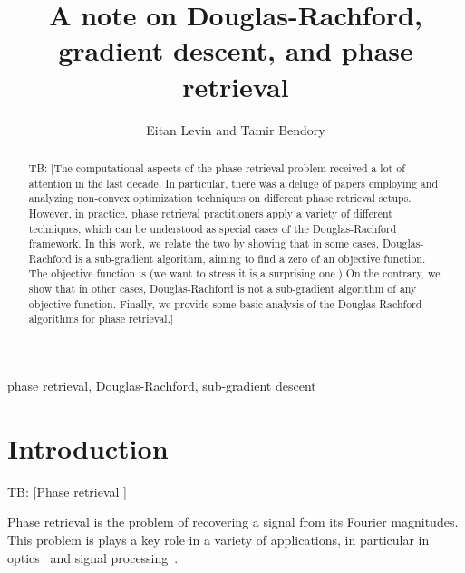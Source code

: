 \documentclass[journal]{IEEEtran}
\theoremstyle{definition}
\theoremstyle{remark}
\theoremstyle{definition}
\theoremstyle{problem}
\theoremstyle{definition}
\newcommand{\tb}[1]{{\color{blue}TB: {[#1]}}}
\begin{document}

\title{A note on Douglas-Rachford, gradient descent, and phase retrieval}

\author{Eitan Levin and Tamir Bendory}
\maketitle

\begin{abstract}
\tb{The computational aspects of the phase retrieval problem received a lot of attention in the last decade. In particular, there was a deluge of papers employing and analyzing non-convex optimization techniques on different phase retrieval setups. However, in practice, phase retrieval practitioners apply a variety of different techniques, which can be understood as special cases of the Douglas-Rachford framework. In this work, we relate the two by showing that in some cases, Douglas-Rachford is a sub-gradient algorithm, aiming to find a zero of an objective function.
The objective function is (we want to stress it is a surprising one.)	
On the contrary, we show that in other cases,  Douglas-Rachford is not a sub-gradient algorithm of any objective function. Finally, we provide some basic analysis of the Douglas-Rachford algorithms for phase retrieval.}
\end{abstract}

\begin{IEEEkeywords}
phase retrieval, Douglas-Rachford, sub-gradient descent 	
\end{IEEEkeywords}
	
\section{Introduction}

\tb{Phase retrieval }


Phase retrieval is the problem of recovering a signal from its Fourier magnitudes. This problem is plays a key role in a variety of applications, in particular in optics~\cite{walther1963question,shechtman2015phase,trebino2012frequency,fienup1987phase} and signal processing~\cite{Bendory2017,baykal2004blind,lawrence2008fundamentals,bendory2017bispectrum}.
\end{document}

